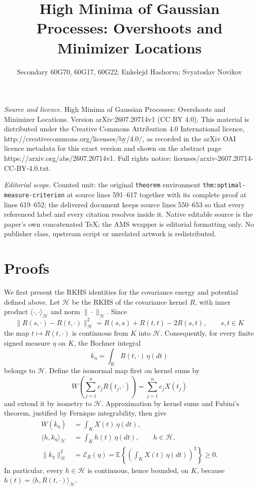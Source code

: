 \documentclass[10pt,a4paper]{amsart}
\newcommand{\Ee}{\mathbb E}
\newcommand{\cH}{\mathcal H}
\begin{document}
\title[High Minima of Gaussian Processes: Overshoots and Minimizer ]{High Minima of Gaussian Processes: Overshoots and Minimizer Locations}
\author{Secondary 60G70, 60G17, 60G22; Enkelejd Hashorva; Svyatoslav Novikov}
\date{}
\maketitle
\noindent\emph{Source and licence.} High Minima of Gaussian Processes: Overshoots and Minimizer Locations. Version arXiv:2607.20714v1 (CC BY 4.0). This material is distributed under the Creative Commons Attribution 4.0 International licence, http://creativecommons.org/licenses/by/4.0/, as recorded in the arXiv OAI licence metadata for this exact version and shown on the abstract page https://arxiv.org/abs/2607.20714v1. Full rights notice: licenses/arxiv-2607.20714-CC-BY-4.0.txt.\par\smallskip
\noindent\textit{Editorial scope.} Counted unit: the original \texttt{theorem} environment \texttt{thm:optimal-measure-criterion} at source lines 591--617 together with its complete proof at lines 619--652; the delivered document keeps source lines 550--653 so that every referenced label and every citation resolves inside it. Native editable source is the paper's own concatenated TeX; the AMS wrapper is editorial formatting only. No publisher class, upstream script or unrelated artwork is redistributed.
\section{Proofs}
\label{sec:proofs}
We first present the RKHS identities for the covariance energy and
potential defined above.  Let $\cH$ be the RKHS of the covariance kernel
$R$, with inner product $\langle\cdot,\cdot\rangle_{\cH}$ and norm
$\|\cdot\|_{\cH}$.  Since
\[
 \|R(s,\cdot)-R(t,\cdot)\|_{\cH}^2
 =R(s,s)+R(t,t)-2R(s,t), \qquad s,t \in K
\]
the map $t\mapsto R(t,\cdot)$ is continuous from $K$ into $\cH$.
Consequently, for every finite signed measure $\eta$ on $K$, the
Bochner integral
\[
 k_\eta=\int_KR(t,\cdot)\,\eta(dt)
\]
belongs to $\cH$.  Define the isonormal map first on kernel sums by
\[
 W\left(\sum_{j=1}^nc_jR(t_j,\cdot)\right)
 =\sum_{j=1}^nc_jX(t_j)
\]
and extend it by isometry to $\cH$.  Approximation by kernel sums and
Fubini's theorem, justified by Fernique integrability, then give
\begin{equation}
 \begin{split}
 W(k_\eta)&=\int_KX(t)\,\eta(dt),\\
 \langle h,k_\eta\rangle_{\cH}&=\int_Kh(t)\,\eta(dt),\qquad h\in\cH,\\
 \|k_\eta\|_{\cH}^2
 &=\mathcal E_R(\eta)
 =\Ee\left\{\left(\int_KX(t)\,\eta(dt)\right)^2\right\}\geq0.
 \end{split}
 \label{eq:rkhs-measure-identities}
\end{equation}
In particular, every $h\in\cH$ is continuous, hence bounded, on $K$,
because $h(t)=\langle h,R(t,\cdot)\rangle_{\cH}$.
\end{document}
